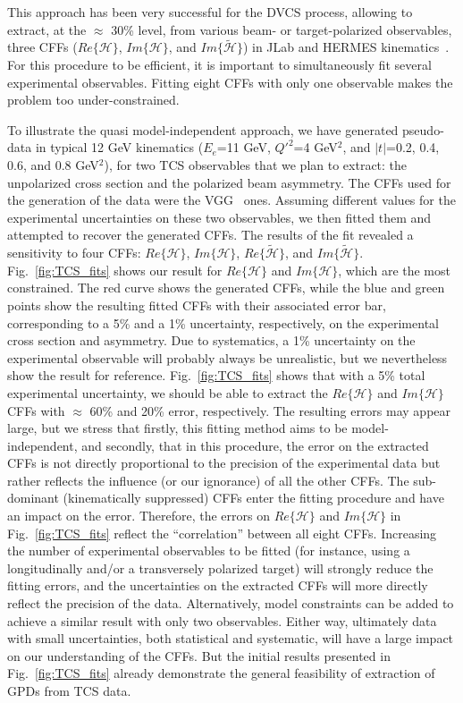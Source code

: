 This approach has been very successful for the DVCS process, allowing to
extract, at the $\approx$ 30\% level, from various beam- or target-polarized
observables, three CFFs
($Re\{\mathcal{H}\}$, $Im\{\mathcal{H}\}$, and $Im\{\tilde{\mathcal{H}}\}$)
in JLab and HERMES kinematics~\cite{Guidal:2010de}.
For this procedure to be efficient, it is important to simultaneously fit
several experimental observables. Fitting eight CFFs with only one observable
makes the problem too under-constrained.

To illustrate the quasi model-independent approach, we have generated
pseudo-data in typical 12 GeV kinematics ($E_e$=11 GeV, $Q'^2$=4 GeV$^2$,
and $|t|$=0.2, 0.4, 0.6, and 0.8 GeV$^2$), for two TCS observables that
we plan to extract: the unpolarized cross section and the polarized beam
asymmetry. The CFFs used for the generation of the data were the
VGG~\cite{Vanderhaeghen:1999xj,Guidal:2004nd} ones. Assuming different values
for the experimental uncertainties on these two observables, we then fitted
them and attempted to recover the generated CFFs. The results of the fit
revealed a sensitivity to four CFFs:
$Re\{\mathcal{H}\}$, $Im\{\mathcal{H}\}$, $Re\{\tilde{\mathcal{H}}\}$, and
$Im\{\tilde{\mathcal{H}}\}$. Fig.~\ref{fig:TCS_fits} shows our result for
$Re\{\mathcal{H}\}$ and $Im\{\mathcal{H}\}$, which are the most constrained.
The red curve shows the generated CFFs, while the blue and green points show
the resulting fitted CFFs with their associated error bar, corresponding to
a 5\% and a 1\% uncertainty, respectively, on the experimental cross section
and asymmetry. Due to systematics, a 1\% uncertainty on the experimental
observable will probably always be unrealistic, but we nevertheless show
the result for reference.
Fig.~\ref{fig:TCS_fits} shows that with a 5\% total experimental uncertainty,
we should be able to extract the $Re\{\mathcal{H}\}$ and $Im\{\mathcal{H}\}$
CFFs with $\approx$ 60\% and 20\% error, respectively.
The resulting errors may appear large, but we stress that firstly, this
fitting method aims to be model-independent, and secondly, that in this
procedure, the error on the extracted CFFs is not directly proportional to the
precision of the experimental data but rather reflects the influence (or our
ignorance) of all the other CFFs. The sub-dominant (kinematically suppressed)
CFFs enter the fitting procedure and have an impact on the error.
Therefore, the errors on $Re\{\mathcal{H}\}$ and $Im\{\mathcal{H}\}$ in
Fig.~\ref{fig:TCS_fits} reflect the ``correlation'' between all eight CFFs.
Increasing the number of experimental observables to be fitted (for instance,
using a longitudinally and/or a transversely polarized target) will strongly
reduce the fitting errors, and the uncertainties on the extracted CFFs will
more directly reflect the precision of the data. Alternatively, model
constraints can be added to achieve a similar result with only two
observables. Either way, ultimately data with small uncertainties, both
statistical and systematic, will have a large impact on our understanding of
the CFFs. But the initial results presented in Fig.~\ref{fig:TCS_fits} already
demonstrate the general feasibility of extraction of GPDs from TCS data.
